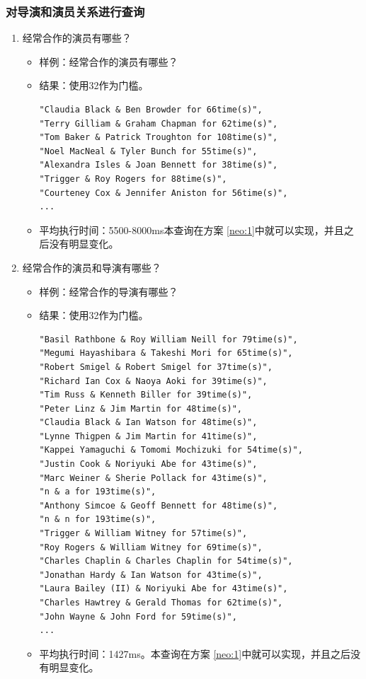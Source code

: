 \documentclass{ctexrep}
\begin{document}
	\subsubsection{对导演和演员关系进行查询}
		\begin{enumerate}
		\item 经常合作的演员有哪些？\begin{itemize}
			\item 样例：经常合作的演员有哪些？
			\item 结果：使用32作为门槛。\begin{lstlisting}
"Claudia Black & Ben Browder for 66time(s)",
"Terry Gilliam & Graham Chapman for 62time(s)",
"Tom Baker & Patrick Troughton for 108time(s)",
"Noel MacNeal & Tyler Bunch for 55time(s)",
"Alexandra Isles & Joan Bennett for 38time(s)",
"Trigger & Roy Rogers for 88time(s)",
"Courteney Cox & Jennifer Aniston for 56time(s)",
...
			\end{lstlisting}
			\item 平均执行时间：5500-8000ms本查询在方案 \ref{neo:1}中就可以实现，并且之后没有明显变化。
		\end{itemize}
		\item 经常合作的演员和导演有哪些？\begin{itemize}
			\item 样例：经常合作的导演有哪些？
			\item 结果：使用32作为门槛。\begin{lstlisting}
"Basil Rathbone & Roy William Neill for 79time(s)",
"Megumi Hayashibara & Takeshi Mori for 65time(s)",
"Robert Smigel & Robert Smigel for 37time(s)",
"Richard Ian Cox & Naoya Aoki for 39time(s)",
"Tim Russ & Kenneth Biller for 39time(s)", 
"Peter Linz & Jim Martin for 48time(s)",
"Claudia Black & Ian Watson for 48time(s)",
"Lynne Thigpen & Jim Martin for 41time(s)",
"Kappei Yamaguchi & Tomomi Mochizuki for 54time(s)",
"Justin Cook & Noriyuki Abe for 43time(s)",
"Marc Weiner & Sherie Pollack for 43time(s)",
"n & a for 193time(s)",
"Anthony Simcoe & Geoff Bennett for 48time(s)",
"n & n for 193time(s)",
"Trigger & William Witney for 57time(s)",
"Roy Rogers & William Witney for 69time(s)",
"Charles Chaplin & Charles Chaplin for 54time(s)",
"Jonathan Hardy & Ian Watson for 43time(s)",
"Laura Bailey (II) & Noriyuki Abe for 43time(s)",
"Charles Hawtrey & Gerald Thomas for 62time(s)",
"John Wayne & John Ford for 59time(s)",
...
			\end{lstlisting}
			\item 平均执行时间：1427ms。本查询在方案 \ref{neo:1}中就可以实现，并且之后没有明显变化。

\end{itemize}
\end{enumerate}
\end{document}
